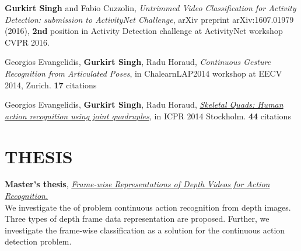 \documentclass[line, margin]{res}
\begin{document}
\begin{resume}
\textbf{Gurkirt Singh} and Fabio Cuzzolin, 
\emph{Untrimmed Video Classification for Activity Detection: submission to ActivityNet Challenge}, 
arXiv preprint arXiv:1607.01979 (2016), \textbf{2nd} position in Activity Detection challenge at ActivityNet workshop CVPR 2016.

Georgios Evangelidis, \textbf{Gurkirt Singh}, Radu Horaud, 
{\emph{Continuous Gesture Recognition from Articulated Poses}}, 
in ChalearnLAP2014 workshop at EECV  2014, Zurich. \textbf{17} citations

Georgios Evangelidis, \textbf{Gurkirt Singh}, Radu Horaud,
\href{https://team.inria.fr/perception/research/icpr2014/}{\emph{Skeletal Quads: Human action recognition using joint quadruples}}, 
in ICPR 2014 Stockholm. \textbf{44} citations
\section{THESIS}

\textbf{Master's thesis}, \href{https://sites.google.com/site/gurkirtcv/research/master-thesis}{\emph{Frame-wise Representations of Depth Videos for Action Recognition.}}\\
We investigate the of problem continuous action recognition from depth images. 
Three types of depth frame data representation are proposed. 
Further, we investigate the frame-wise classification as a solution for the continuous action detection problem.


\end{resume}
\end{document}
